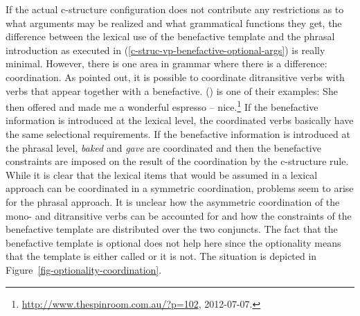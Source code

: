If the actual c-structure configuration does not contribute any restrictions as to what arguments
may be realized and what grammatical functions they get, the difference between the lexical use of the
benefactive template and the phrasal introduction as executed in
(\ref{c-struc-vp-benefactive-optional-args}) is really minimal. However, there is one area in
grammar where there is a difference: coordination. As \citet[Section~6.1]{MWArgSt} pointed out, it is
possible to coordinate ditransitive verbs with verbs that appear together with a
benefactive. () is one of their examples:
\ea%
\label{ex-coordination-benefactive}
\label{ex-offered-and-made}
She then offered and made me a wonderful espresso -- nice.\footnote{%
  \url{http://www.thespinroom.com.au/?p=102}, 2012-07-07.}
\z
If the benefactive information is introduced at the lexical level, the coordinated verbs basically
have the same selectional requirements. If the benefactive information is introduced at the phrasal
level, \emph{baked} and \emph{gave} are coordinated and then the benefactive constraints are imposed
on the result of the coordination by the c-structure rule. While it is clear that the lexical items
that would be assumed in a lexical approach can be coordinated in a symmetric coordination, problems
seem to arise for the phrasal approach. It is unclear how the asymmetric coordination of the mono-
and ditransitive verbs can be accounted for and how the constraints of the benefactive template are
distributed over the two conjuncts. The fact that the benefactive template is optional does not help
here since the optionality means that the template is either called or it is not. The situation is
depicted in Figure~\vref{fig-optionality-coordination}.

